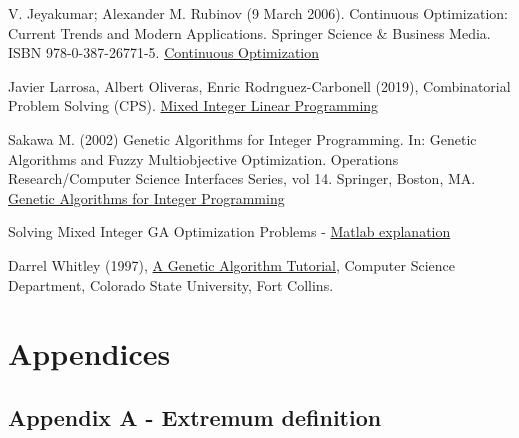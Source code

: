 \documentclass[12pt]{article}
\numberwithin{equation}{section}
\begin{document}
\begin{flushleft}
\begin{thebibliography}{9}
  \label{continuity} 
V. Jeyakumar; Alexander M. Rubinov (9 March 2006). Continuous Optimization: Current Trends and Modern Applications. Springer Science $\&$ Business Media. ISBN 978-0-387-26771-5.
\href{https://books.google.co.il/books?id=QePsbLIwwEoC&printsec=frontcover&dq=%22Continuous+optimization%22&hl=en&sa=X&redir_esc=y#v=onepage&q=%22Continuous%20optimization%22&f=false}{Continuous Optimization}


  \label{MILP_1}
Javier Larrosa, Albert Oliveras, Enric Rodrıguez-Carbonell (2019), Combinatorial Problem Solving (CPS). 
\href{https://www.cs.upc.edu/~erodri/webpage/cps/theory/lp/milp/slides.pdf}{Mixed Integer Linear Programming}


  \label{MILP_2}
Sakawa M. (2002) Genetic Algorithms for Integer Programming. In: Genetic Algorithms and Fuzzy Multiobjective Optimization. Operations Research/Computer Science Interfaces Series, vol 14. Springer, Boston, MA. 
\href{https://link.springer.com/chapter/10.1007/978-1-4615-1519-7_5}{Genetic Algorithms for Integer Programming}


 \label{matlab_problem}
Solving Mixed Integer GA Optimization Problems - \href{https://www.mathworks.com/help/gads/mixed-integer-optimization.html#bs1clc2}{Matlab explanation}

 \label{noise}
Darrel Whitley (1997), \href{https://web.archive.org/web/20130615042000/http://samizdat.mines.edu/ga_tutorial/ga_tutorial.ps}{A Genetic Algorithm Tutorial}, Computer Science Department, Colorado State University, Fort Collins.


\end{thebibliography}
\newpage

\section*{Appendices} 

\subsection*{\hypertarget{app_extremum}{Appendix A} - Extremum definition} 


\end{flushleft}
\end{document}
